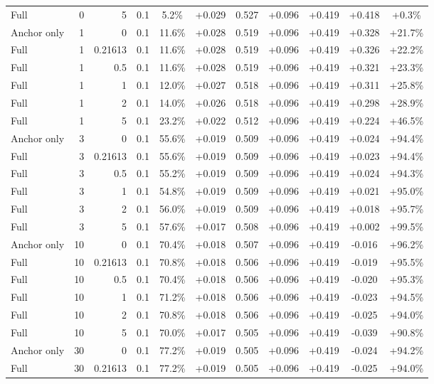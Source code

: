 \begin{table}[htbp]
\begin{tabular}{lrrrccccccc}
Full & 0 & 5 & 0.1 & 5.2\% & +0.029 & 0.527 & +0.096 & +0.419 & +0.418 & +0.3\% \\
Anchor only & 1 & 0 & 0.1 & 11.6\% & +0.028 & 0.519 & +0.096 & +0.419 & +0.328 & +21.7\% \\
Full & 1 & 0.21613 & 0.1 & 11.6\% & +0.028 & 0.519 & +0.096 & +0.419 & +0.326 & +22.2\% \\
Full & 1 & 0.5 & 0.1 & 11.6\% & +0.028 & 0.519 & +0.096 & +0.419 & +0.321 & +23.3\% \\
Full & 1 & 1 & 0.1 & 12.0\% & +0.027 & 0.518 & +0.096 & +0.419 & +0.311 & +25.8\% \\
Full & 1 & 2 & 0.1 & 14.0\% & +0.026 & 0.518 & +0.096 & +0.419 & +0.298 & +28.9\% \\
Full & 1 & 5 & 0.1 & 23.2\% & +0.022 & 0.512 & +0.096 & +0.419 & +0.224 & +46.5\% \\
Anchor only & 3 & 0 & 0.1 & 55.6\% & +0.019 & 0.509 & +0.096 & +0.419 & +0.024 & +94.4\% \\
Full & 3 & 0.21613 & 0.1 & 55.6\% & +0.019 & 0.509 & +0.096 & +0.419 & +0.023 & +94.4\% \\
Full & 3 & 0.5 & 0.1 & 55.2\% & +0.019 & 0.509 & +0.096 & +0.419 & +0.024 & +94.3\% \\
Full & 3 & 1 & 0.1 & 54.8\% & +0.019 & 0.509 & +0.096 & +0.419 & +0.021 & +95.0\% \\
Full & 3 & 2 & 0.1 & 56.0\% & +0.019 & 0.509 & +0.096 & +0.419 & +0.018 & +95.7\% \\
Full & 3 & 5 & 0.1 & 57.6\% & +0.017 & 0.508 & +0.096 & +0.419 & +0.002 & +99.5\% \\
Anchor only & 10 & 0 & 0.1 & 70.4\% & +0.018 & 0.507 & +0.096 & +0.419 & -0.016 & +96.2\% \\
Full & 10 & 0.21613 & 0.1 & 70.8\% & +0.018 & 0.506 & +0.096 & +0.419 & -0.019 & +95.5\% \\
Full & 10 & 0.5 & 0.1 & 70.4\% & +0.018 & 0.506 & +0.096 & +0.419 & -0.020 & +95.3\% \\
Full & 10 & 1 & 0.1 & 71.2\% & +0.018 & 0.506 & +0.096 & +0.419 & -0.023 & +94.5\% \\
Full & 10 & 2 & 0.1 & 70.8\% & +0.018 & 0.506 & +0.096 & +0.419 & -0.025 & +94.0\% \\
Full & 10 & 5 & 0.1 & 70.0\% & +0.017 & 0.505 & +0.096 & +0.419 & -0.039 & +90.8\% \\
Anchor only & 30 & 0 & 0.1 & 77.2\% & +0.019 & 0.505 & +0.096 & +0.419 & -0.024 & +94.2\% \\
Full & 30 & 0.21613 & 0.1 & 77.2\% & +0.019 & 0.505 & +0.096 & +0.419 & -0.025 & +94.0\% \\

\end{tabular}
\end{table}

